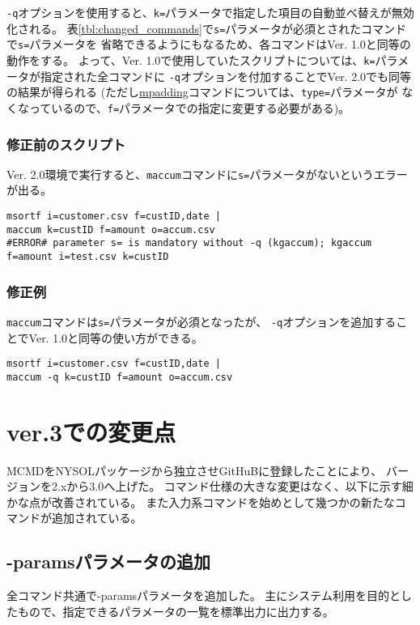 \verb|-q|オプションを使用すると、\verb|k=|パラメータで指定した項目の自動並べ替えが無効化される。
表\ref{tbl:changed_commands}で\verb|s=|パラメータが必須とされたコマンドで\verb|s=|パラメータを
省略できるようにもなるため、各コマンドはVer. 1.0と同等の動作をする。
よって、Ver. 1.0で使用していたスクリプトについては、\verb|k=|パラメータが指定された全コマンドに
\verb|-q|オプションを付加することでVer. 2.0でも同等の結果が得られる
(ただし\hyperref[sect:mpadding]{mpadding}コマンドについては、\verb|type=|パラメータが
なくなっているので、\verb|f=|パラメータでの指定に変更する必要がある)。

\subsubsection*{修正前のスクリプト}
Ver. 2.0環境で実行すると、\verb|maccum|コマンドに\verb|s=|パラメータがないというエラーが出る。
\begin{Verbatim}[baselinestretch=0.7,frame=single]
msortf i=customer.csv f=custID,date |
maccum k=custID f=amount o=accum.csv
#ERROR# parameter s= is mandatory without -q (kgaccum); kgaccum f=amount i=test.csv k=custID
\end{Verbatim}

\subsubsection*{修正例}
\verb|maccum|コマンドは\verb|s=|パラメータが必須となったが、
\verb|-q|オプションを追加することでVer. 1.0と同等の使い方ができる。
\begin{Verbatim}[baselinestretch=0.7,frame=single]
msortf i=customer.csv f=custID,date |
maccum -q k=custID f=amount o=accum.csv
\end{Verbatim}

\section{ver.3での変更点\label{sect:changes}}

MCMDをNYSOLパッケージから独立させGitHuBに登録したことにより、
バージョンを2.xから3.0へ上げた。
コマンド仕様の大きな変更はなく、以下に示す細かな点が改善されている。
また入力系コマンドを始めとして幾つかの新たなコマンドが追加されている。

\subsection{-paramsパラメータの追加}
全コマンド共通で-paramsパラメータを追加した。
主にシステム利用を目的としたもので、指定できるパラメータの一覧を標準出力に出力する。


